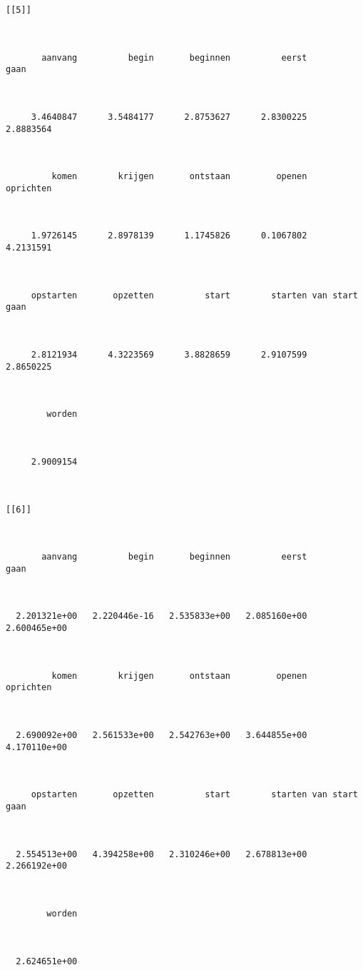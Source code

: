 \begin{lstlisting}
[[5]]



       aanvang          begin       beginnen          eerst           gaan 



     3.4640847      3.5484177      2.8753627      2.8300225      2.8883564 



         komen        krijgen       ontstaan         openen      oprichten 



     1.9726145      2.8978139      1.1745826      0.1067802      4.2131591 



     opstarten       opzetten          start        starten van start gaan 



     2.8121934      4.3223569      3.8828659      2.9107599      2.8650225 



        worden 



     2.9009154 



[[6]]



       aanvang          begin       beginnen          eerst           gaan 



  2.201321e+00   2.220446e-16   2.535833e+00   2.085160e+00   2.600465e+00 



         komen        krijgen       ontstaan         openen      oprichten 



  2.690092e+00   2.561533e+00   2.542763e+00   3.644855e+00   4.170110e+00 



     opstarten       opzetten          start        starten van start gaan 



  2.554513e+00   4.394258e+00   2.310246e+00   2.678813e+00   2.266192e+00 



        worden 



  2.624651e+00 
\end{lstlisting}

